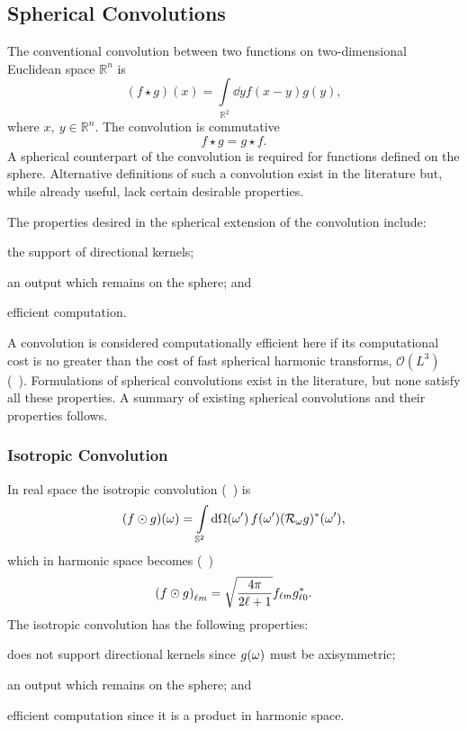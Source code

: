 \subsection{Spherical Convolutions}\label{sec:chapter2_spherical_convolutions}

The conventional convolution between two functions on two-dimensional Euclidean space \(\mathbb{R}^{n}\) is
%
\begin{equation}
	(f \star g)(x)
	= \int\limits_{\mathbb{R}^{2}} \dd{y} f(x-y) g(y),
\end{equation}
%
where \(x,\ y \in \mathbb{R}^{n}\).
The convolution is commutative
%
\begin{equation}
	f \star g
	= g \star f.
\end{equation}
%
A spherical counterpart of the convolution is required for functions defined on the sphere.
Alternative definitions of such a convolution exist in the literature but, while already useful, lack certain desirable properties.

The properties desired in the spherical extension of the convolution include:
%
\begin{inparaenum}[(i)]
	\item the support of directional kernels;
	\item an output which remains on the sphere; and
	\item efficient computation.
\end{inparaenum}
%
A convolution is considered computationally efficient here if its computational cost is no greater than the cost of fast spherical harmonic transforms, \ie{} \(\mathcal{O}(L^{3})\) (\eg{}~\cite{Driscoll1994,McEwen2011}).
Formulations of spherical convolutions exist in the literature, but none satisfy all these properties.
A summary of existing spherical convolutions and their properties follows.

\subsubsection{Isotropic Convolution}

In real space the isotropic convolution (\eg{}~\cite{McEwen2007,Wei2011,Kennedy2011}) is
%
\begin{equation}
	\pixel{(f \odot g)}
	= \integrateSphere{\omega'} \pixel[']{f} \pixel[']{\conj{(\rotation{\omega}g)}},
\end{equation}
%
which in harmonic space becomes (\eg{}~\cite{McEwen2007})
%
\begin{equation}\label{eq:chapter2_isotropic_harmonic}
	\harmonic{(f \odot g)}
	= \sqrt{\inverseFactor} \harmonic{f} \conj{\axiHarmonic{g}}.
\end{equation}
%
The isotropic convolution has the following properties:
%
\begin{inparaenum}[(i)]
	\item does not support directional kernels since \(\pixel{g}\) must be axisymmetric;
	\item an output which remains on the sphere; and
	\item efficient computation since it is a product in harmonic space.
\end{inparaenum}

